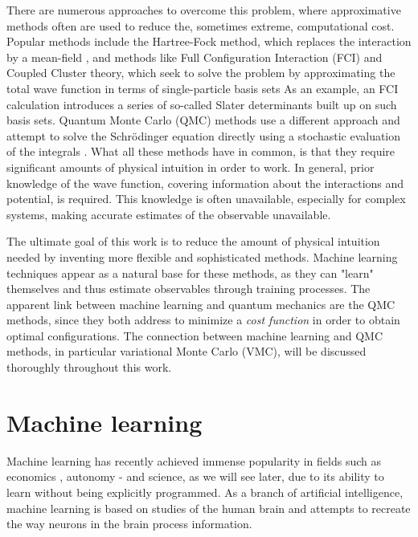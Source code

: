 There are numerous approaches to overcome this problem, where approximative methods often are used to reduce the, sometimes extreme, computational cost. Popular methods include the Hartree-Fock method, which replaces the interaction by a mean-field \supercite{hartree_wave_1928, fock_selfconsistent_1930}, and methods like Full Configuration Interaction (FCI) and Coupled Cluster theory, which seek to solve the problem by approximating the total wave function in terms of single-particle basis sets \supercite{daniel_crawford_introduction_2007} As an example, an FCI calculation introduces a series of so-called Slater determinants built up on such basis sets. Quantum Monte Carlo (QMC) methods use a different approach and attempt to solve the Schrödinger equation directly using a stochastic evaluation of the integrals \supercite{bajdich_electronic_2010}. What all these methods have in common, is that they require significant amounts of physical intuition in order to work. In general, prior knowledge of the wave function, covering information about the interactions and potential, is required. This knowledge is often unavailable, especially for complex systems, making accurate estimates of the observable unavailable. 

The ultimate goal of this work is to reduce the amount of physical intuition needed by inventing more flexible and sophisticated methods. Machine learning techniques appear as a natural base for these methods, as they can "learn" themselves and thus estimate observables through training processes. The apparent link between machine learning and quantum mechanics are the QMC methods, since they both address to minimize a \textit{cost function} in order to obtain optimal configurations. The connection between machine learning and QMC methods, in particular variational Monte Carlo (VMC), will be discussed thoroughly throughout this work.

\section{Machine learning} \label{sec:machinelearning}
Machine learning has recently achieved immense popularity in fields such as economics \supercite{dube_scalable_2017}, autonomy \supercite{chernova_interactive_2009} - and science, as we will see later, due to its ability to learn without being explicitly programmed. As a branch of artificial intelligence, machine learning is based on studies of the human brain and attempts to recreate the way neurons in the brain process information.


